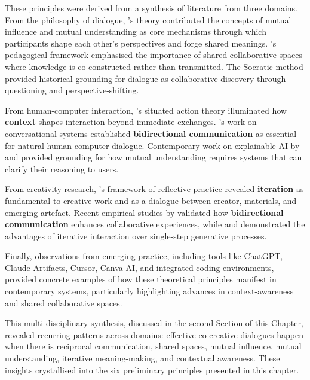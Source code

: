 These principles were derived from a synthesis of literature from three domains. From the philosophy of dialogue, \citeauthor{Bohm1996-fo}'s \citep{Bohm1996-fo} theory contributed the concepts of mutual influence and mutual understanding as core mechanisms through which participants shape each other's perspectives and forge shared meanings. \citeauthor{Freire1970-pa}'s \citep{Freire1970-pa} pedagogical framework emphasised the importance of shared collaborative spaces where knowledge is co-constructed rather than transmitted. The Socratic method provided historical grounding for dialogue as collaborative discovery through questioning and perspective-shifting.

From human-computer interaction, \citeauthor{Suchman2006-bs}'s \citep{Suchman2006-bs} situated action theory illuminated how \textbf{context} shapes interaction beyond immediate exchanges. \citeauthor{Hayes1983-ca}'s \citep{Hayes1983-ca} work on conversational systems established \textbf{bidirectional communication} as essential for natural human-computer dialogue. Contemporary work on explainable AI by \citet{Ribeiro2016-xb} and \citet{Doshi-Velez2017-qv} provided grounding for how mutual understanding requires systems that can clarify their reasoning to users.

From creativity research, \citeauthor{Schon1987-fy}'s \citep{Schon1987-fy, Schon1992-jt} framework of reflective practice revealed \textbf{iteration} as fundamental to creative work and as a dialogue between creator, materials, and emerging artefact. Recent empirical studies by \citet{Rezwana2022-gg} validated how \textbf{bidirectional communication} enhances collaborative experiences, while \citet{Park2024-gw} and \citet{DellAcqua2023-og} demonstrated the advantages of iterative interaction over single-step generative processes.

Finally, observations from emerging practice, including tools like ChatGPT, Claude Artifacts, Cursor, Canva AI, and integrated coding environments, provided concrete examples of how these theoretical principles manifest in contemporary systems, particularly highlighting advances in context-awareness and shared collaborative spaces.

This multi-disciplinary synthesis, discussed in the second Section of this Chapter, revealed recurring patterns across domains: effective co-creative dialogues happen when there is reciprocal communication, shared spaces, mutual influence, mutual understanding, iterative meaning-making, and contextual awareness. These insights crystallised into the six preliminary principles presented in this chapter.

